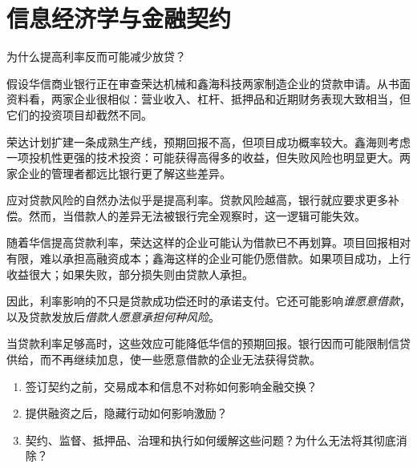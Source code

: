 \chapter{信息经济学与金融契约}
\label{chap:Information_Economics_and_Financial_Contracts}

\begin{openingcase}{为什么提高利率反而可能减少放贷？}

假设华信商业银行正在审查荣达机械和鑫海科技两家制造企业的贷款申请。从书面资料看，两家企业很相似：营业收入、杠杆、抵押品和近期财务表现大致相当，但它们的投资项目却截然不同。

荣达计划扩建一条成熟生产线，预期回报不高，但项目成功概率较大。鑫海则考虑一项投机性更强的技术投资：可能获得高得多的收益，但失败风险也明显更大。两家企业的管理者都远比银行更了解这些差异。

应对贷款风险的自然办法似乎是提高利率。贷款风险越高，银行就应要求更多补偿。然而，当借款人的差异无法被银行完全观察时，这一逻辑可能失效。

随着华信提高贷款利率，荣达这样的企业可能认为借款已不再划算。项目回报相对有限，难以承担高融资成本；鑫海这样的企业可能仍愿借款。如果项目成功，上行收益很大；如果失败，部分损失则由贷款人承担。

因此，利率影响的不只是贷款成功偿还时的承诺支付。它还可能影响\emph{谁愿意借款}，以及贷款发放后\emph{借款人愿意承担何种风险}。

当贷款利率足够高时，这些效应可能降低华信的预期回报。银行因而可能限制信贷供给，而不再继续加息，使一些愿意借款的企业无法获得贷款。

\end{openingcase}

\begin{tcolorbox}[
  enhanced,
  colback=FinanceBlue!6,
  colframe=FinanceBlue,
  boxrule=0.6pt,
  sharp corners,
  left=8pt,
  right=8pt,
  top=7pt,
  bottom=7pt,
  before skip=1em,
  after skip=1.6em,
  title=\textbf{核心问题},
  coltitle=white,
  colbacktitle=FinanceBlue,
  fonttitle=\bfseries,
  attach boxed title to top left={xshift=6pt,yshift=-2mm},
  boxed title style={
    boxrule=0pt,
    sharp corners,
    left=5pt,
    right=5pt,
    top=2pt,
    bottom=2pt
  }
]
\begin{enumerate}[
  leftmargin=*,
  label=\textcolor{FinanceBlue}{\textbf{\arabic*.}},
  itemsep=0.55em,
  topsep=0.2em
]
\item 签订契约之前，交易成本和信息不对称如何影响金融交换？

\item 提供融资之后，隐藏行动如何影响激励？

\item 契约、监督、抵押品、治理和执行如何缓解这些问题？为什么无法将其彻底消除？

\end{enumerate}
\end{tcolorbox}

